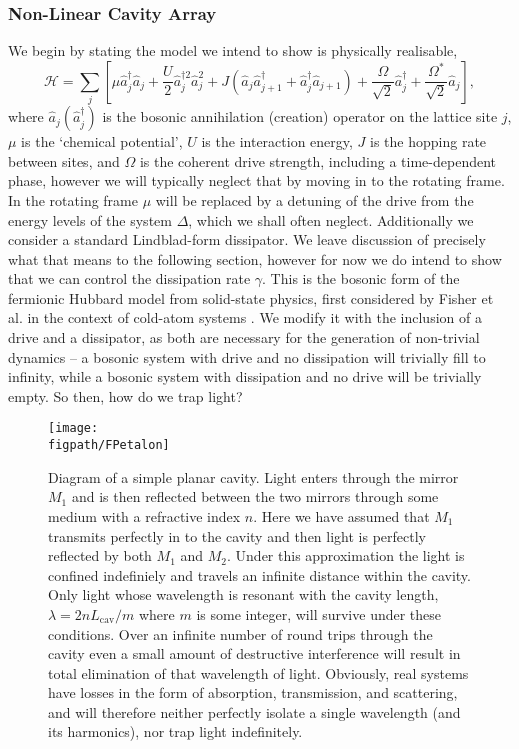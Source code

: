 \subsubsection{Non-Linear Cavity Array}
We begin by stating the model we intend to show is physically realisable,
\begin{equation}
	\mathcal{H} = \sum_{j} \left[\mu\hat{a}_{j}^{\dagger}\hat{a}_{j} + \frac{U}{2}\hat{a}_{j}^{\dagger 2}\hat{a}_{j}^{2} + J(\hat{a}_{j}\hat{a}_{j+1}^{\dagger} + \hat{a}_{j}^{\dagger}\hat{a}_{j+1}) + \frac{\Omega}{\sqrt{2}}\hat{a}_{j}^{\dagger} + \frac{\Omega^{*}}{\sqrt{2}}\hat{a}_{j} \right],
	\label{eq:mbq2-1}
\end{equation}
where \(\hat{a}_{j} (\hat{a}_{j}^{\dagger})\) is the bosonic annihilation (creation) operator on the lattice site \(j\), \(\mu\) is the `chemical potential', \(U\) is the interaction energy, \(J\) is the hopping rate between sites, and \(\Omega\) is the coherent drive strength, including a time-dependent phase, however we will typically neglect that by moving in to the rotating frame. In the rotating frame \(\mu\) will be replaced by a detuning of the drive from the energy levels of the system \(\Delta\), which we shall often neglect. Additionally we consider a standard Lindblad-form dissipator. We leave discussion of precisely what that means to the following section, however for now we do intend to show that we can control the dissipation rate \(\gamma\). This is the bosonic form of the fermionic Hubbard model \cite{Hubbard63} from solid-state physics, first considered by Fisher et al. in the context of cold-atom systems \cite{FWGF89,HBP08}. We modify it with the inclusion of a drive and a dissipator, as both are necessary for the generation of non-trivial dynamics -- a bosonic system with drive and no dissipation will trivially fill to infinity, while a bosonic system with dissipation and no drive will be trivially empty. So then, how do we trap light?

\begin{figure}[ht!]
\centering
\texttt{[image: \\figpath/FPetalon]}
\caption{Diagram of a simple planar cavity. Light enters through the mirror \(M_{1}\) and is then reflected between the two mirrors through some medium with a refractive index \(n\). Here we have assumed that \(M_{1}\) transmits perfectly in to the cavity and then light is perfectly reflected by both \(M_{1}\) and \(M_{2}\). Under this approximation the light is confined indefiniely and travels an infinite distance within the cavity. Only light whose wavelength is resonant with the cavity length, \(\lambda = 2nL_{\mathrm{cav}} / m\) where \(m\) is some integer, will survive under these conditions. Over an infinite number of round trips through the cavity even a small amount of destructive interference will result in total elimination of that wavelength of light. Obviously, real systems have losses in the form of absorption, transmission, and scattering, and will therefore neither perfectly isolate a single wavelength (and its harmonics), nor trap light indefinitely.}
\label{fig:mbq2-1}
\end{figure}


